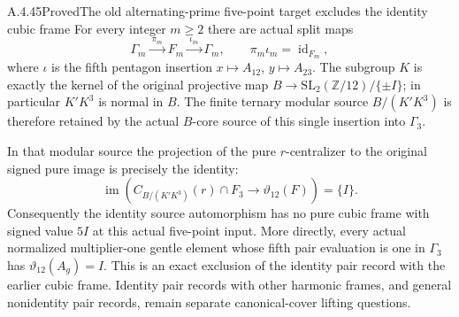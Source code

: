 \begin{result}{A.4.45}{Proved}{The old alternating-prime five-point target excludes the identity cubic frame}
For every integer $m\geq2$ there are actual split
maps
\[
 \Gamma_m\xrightarrow{\ \pi_m\ }F_m
       \xrightarrow{\ \iota_m\ }\Gamma_m,
 \qquad \pi_m\iota_m=\operatorname{id}_{F_m},
                                                               \tag{TMR.3}
\]
where $\iota$ is the fifth pentagon insertion
$x\mapsto A_{12}$, $y\mapsto A_{23}$.
The subgroup $K$ is exactly the kernel of the
original projective map
$B\to\mathrm{SL}_2(\mathbb Z/12)/\{\pm I\}$;
in particular $K'K^3$ is normal in $B$.
The finite ternary modular source
$B/(K'K^3)$ is therefore retained by the actual
$B$-core source of this single insertion into
$\Gamma_3$.

In that modular source the projection of the
pure $r$-centralizer to the original signed pure
image is precisely the identity:
\[
 \operatorname{im}\left(
 C_{B/(K'K^3)}(r)\cap F_3
             \longrightarrow\vartheta_{12}(F)\right)=\{I\}.
                                                               \tag{TMR.4}
\]
Consequently the identity source automorphism has
no pure cubic frame with signed value $5I$ at
this actual five-point input.  More directly,
every actual normalized multiplier-one gentle
element whose fifth pair evaluation is one in
$\Gamma_3$ has $\vartheta_{12}(A_g)=I$.
This is an exact exclusion of the identity pair
record with the earlier cubic frame.  Identity
pair records with other harmonic frames, and
general nonidentity pair records, remain separate
canonical-cover lifting questions.
\end{result}
